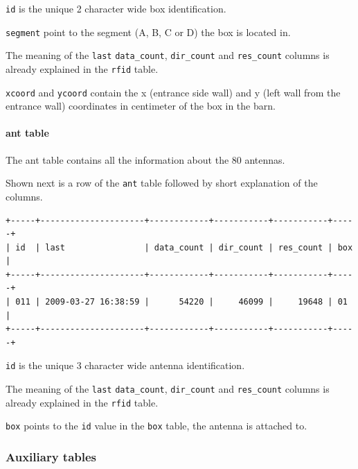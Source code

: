 \begin{mydesc}
	\item \lstinline|id| is the unique 2 character wide box identification.
	\item \lstinline|segment| point to the segment (A, B, C or D) the box is located in.
	\item The meaning of the \lstinline|last| \lstinline|data_count|, \lstinline|dir_count| and \lstinline|res_count| columns is already explained in the \lstinline|rfid| table.
	\item \lstinline|xcoord| and \lstinline|ycoord| contain the x (entrance side wall) and y (left wall from the entrance wall) coordinates in centimeter of the box in the barn.
\end{mydesc}

\paragraph{ant table}
\label{para:ant_table}

The ant table contains all the information about the 80 antennas. 

Shown next is a row of the \lstinline|ant| table followed by short explanation of the columns.
\codescript
\begin{lstlisting}[frame=none]
+-----+---------------------+------------+-----------+-----------+-----+
| id  | last                | data_count | dir_count | res_count | box |
+-----+---------------------+------------+-----------+-----------+-----+
| 011 | 2009-03-27 16:38:59 |      54220 |     46099 |     19648 | 01  | 
+-----+---------------------+------------+-----------+-----------+-----+

\end{lstlisting}

\begin{mydesc}
	\item \lstinline|id| is the unique 3 character wide antenna identification.
	\item The meaning of the \lstinline|last| \lstinline|data_count|, \lstinline|dir_count| and \lstinline|res_count| columns is already explained in the \lstinline|rfid| table.
	\item \lstinline|box| points to the \lstinline|id| value in the \lstinline|box| table, the antenna is attached to.
\end{mydesc}

\subsubsection{Auxiliary tables}

